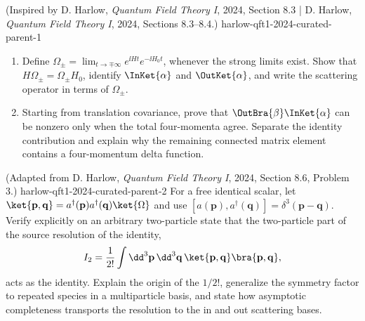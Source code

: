 
\begin{enumerate}
  {(Inspired by D. Harlow, \emph{Quantum Field Theory I}, 2024, Section 8.3 | D. Harlow, \emph{Quantum Field Theory I}, 2024, Sections 8.3--8.4.)}
  {harlow-qft1-2024-curated-parent-1}
\begin{enumerate}
\item
Define
\(\Omega_\pm=\lim_{t\to\mp\infty}e^{\ii Ht}e^{-\ii H_0t}\), whenever the strong
limits exist.  Show that \(H\Omega_\pm=\Omega_\pm H_0\), identify
\(\InKet{\alpha}\) and \(\OutKet{\alpha}\), and write the scattering
operator in terms of \(\Omega_\pm\).
\item
Starting from translation covariance, prove that
\(\OutBra{\beta}\InKet{\alpha}\) can be nonzero only when the total
four-momenta agree.  Separate the identity contribution and explain why
the remaining connected matrix element contains a four-momentum delta
function.
\end{enumerate}

  {(Adapted from D. Harlow, \emph{Quantum Field Theory I}, 2024, Section 8.6, Problem 3.)}
  {harlow-qft1-2024-curated-parent-2}
For a free identical scalar, let
\(\ket{\mathbf p,\mathbf q}
=a^\dagger(\mathbf p)a^\dagger(\mathbf q)\ket{\Omega}\) and use
\([a(\mathbf p),a^\dagger(\mathbf q)]
=\delta^3(\mathbf p-\mathbf q)\).  Verify explicitly on an arbitrary
two-particle state that the two-particle part of the source resolution
of the identity,
\[
 I_2=\frac1{2!}\int \dd^3\mathbf p\,\dd^3\mathbf q\,
 \ket{\mathbf p,\mathbf q}\bra{\mathbf p,\mathbf q},
\]
acts as the identity.  Explain the origin of the \(1/2!\), generalize the
symmetry factor to repeated species in a multiparticle basis, and state
how asymptotic completeness transports the resolution to the in and out
scattering bases.


\end{enumerate}
